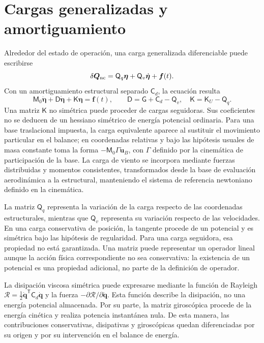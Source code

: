 \documentclass[11pt,a4paper,oneside]{report}
\newcommand{\vct}[1]{\bm{#1}}
\newcommand{\tr}{\mathsf T}
\begin{document}
\section{Cargas generalizadas y amortiguamiento}
Alrededor del estado de operación, una carga generalizada diferenciable puede escribirse
\begin{equation}
 \delta\vct Q_{\rm nc}=\mathsf Q_q\vct\eta+
 \mathsf Q_v\dot{\vct\eta}+\vct f(t).
\end{equation}
Con un amortiguamiento estructural separado $\mathsf C_d$, la ecuación resulta
\begin{equation}
 \mathsf M_0\ddot{\vct\eta}+\mathsf D\dot{\vct\eta}
 +\mathsf K\vct\eta=\vct f(t),\qquad
 \mathsf D=\mathsf G+\mathsf C_d-\mathsf Q_v,
 \quad\mathsf K=\mathsf K_U-\mathsf Q_q.
 \label{eq:finaldynamic}
\end{equation}
Una matriz $\mathsf K$ no simétrica puede proceder de cargas seguidoras. Sus coeficientes no se deducen de un hessiano simétrico de energía potencial ordinaria. Para una base traslacional impuesta, la carga equivalente aparece al sustituir el movimiento particular en el balance; en coordenadas relativas y bajo las hipótesis usuales de masa constante toma la forma $-\mathsf M_0\mathsf\Gamma\ddot{\vct u}_B$, con $\mathsf\Gamma$ definido por la cinemática de participación de la base. La carga de viento se incorpora mediante fuerzas distribuidas y momentos consistentes, transformados desde la base de evaluación aerodinámica a la estructural, manteniendo el sistema de referencia newtoniano definido en la cinemática.

La matriz $\mathsf Q_q$ representa la variación de la carga respecto de las coordenadas estructurales, mientras que $\mathsf Q_v$ representa su variación respecto de las velocidades. En una carga conservativa de posición, la tangente procede de un potencial y es simétrica bajo las hipótesis de regularidad. Para una carga seguidora, esa propiedad no está garantizada. Una matriz puede representar un operador lineal aunque la acción física correspondiente no sea conservativa: la existencia de un potencial es una propiedad adicional, no parte de la definición de operador.

La disipación viscosa simétrica puede expresarse mediante la función de Rayleigh $\mathcal R=\tfrac12\dot{\vct q}^{\tr}\mathsf C_d\dot{\vct q}$ y la fuerza $-\partial\mathcal R/\partial\dot{\vct q}$. Esta función describe la disipación, no una energía potencial almacenada. Por su parte, la matriz giroscópica procede de la energía cinética y realiza potencia instantánea nula. De esta manera, las contribuciones conservativas, disipativas y giroscópicas quedan diferenciadas por su origen y por su intervención en el balance de energía.
\end{document}
